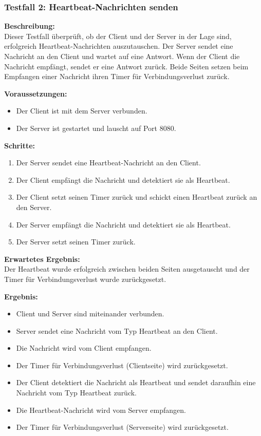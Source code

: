 \documentclass[thesis.tex]{subfiles}
\begin{document}
\pagebreak

\subsubsection*{Testfall 2: Heartbeat-Nachrichten senden}

\textbf{Beschreibung:}\\
Dieser Testfall überprüft, ob der Client und der Server in der Lage sind, erfolgreich Heartbeat-Nachrichten auszutauschen. Der Server sendet eine Nachricht an den Client und wartet auf eine Antwort. Wenn der Client die Nachricht empfängt, sendet er eine Antwort zurück. Beide Seiten setzen beim Empfangen einer Nachricht ihren Timer für Verbindungsverlust zurück.

\textbf{Voraussetzungen:}
\begin{itemize}
    \item Der Client ist mit dem Server verbunden.
    \item Der Server ist gestartet und lauscht auf Port 8080.
\end{itemize}

\textbf{Schritte:}
\begin{enumerate}
    \item Der Server sendet eine Heartbeat-Nachricht an den Client.
    \item Der Client empfängt die Nachricht und detektiert sie als Heartbeat.
    \item Der Client setzt seinen Timer zurück und schickt einen Heartbeat zurück an den Server.
    \item Der Server empfängt die Nachricht und detektiert sie als Heartbeat.
    \item Der Server setzt seinen Timer zurück.
\end{enumerate}

\textbf{Erwartetes Ergebnis:}\\
Der Heartbeat wurde erfolgreich zwischen beiden Seiten ausgetauscht und der Timer für Verbindungsverlust wurde zurückgesetzt.

\textbf{Ergebnis:}
\begin{itemize}
    \item Client und Server sind miteinander verbunden.
    \item Server sendet eine Nachricht vom Typ Heartbeat an den Client.
    \item Die Nachricht wird vom Client empfangen.
    \item Der Timer für Verbindungsverlust (Clientseite) wird zurückgesetzt.
    \item Der Client detektiert die Nachricht als Heartbeat und sendet daraufhin eine Nachricht vom Typ Heartbeat zurück.
    \item Die Heartbeat-Nachricht wird vom Server empfangen.
    \item Der Timer für Verbindungsverlust (Serverseite) wird zurückgesetzt.
\end{itemize}
\end{document}
